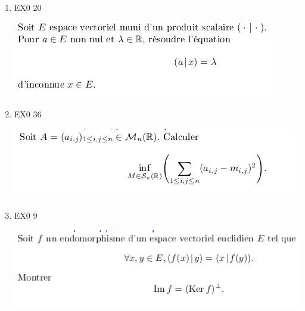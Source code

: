 \documentclass[a4paper,11pt]{article}
\begin{document}
	
\begin{enumerate}
	\item EX0 20
	
	
	\includegraphics{c1.png}
	
	
	\item EX0 36
	
	
	\includegraphics{c2.png}
	
	\item EX0 9
	
	
	\includegraphics{c3.png}
	

	
\end{enumerate}	
\end{document}
